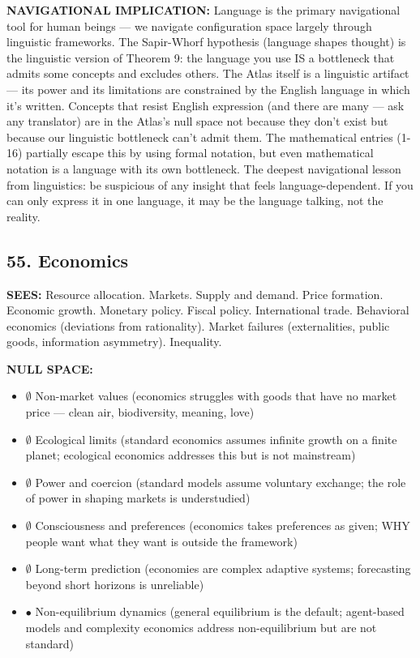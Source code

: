 \textbf{NAVIGATIONAL IMPLICATION:} Language is the primary navigational tool for human beings — we navigate configuration space largely through linguistic frameworks. The Sapir-Whorf hypothesis (language shapes thought) is the linguistic version of Theorem 9: the language you use IS a bottleneck that admits some concepts and excludes others. The Atlas itself is a linguistic artifact — its power and its limitations are constrained by the English language in which it's written. Concepts that resist English expression (and there are many — ask any translator) are in the Atlas's null space not because they don't exist but because our linguistic bottleneck can't admit them. The mathematical entries (1-16) partially escape this by using formal notation, but even mathematical notation is a language with its own bottleneck. The deepest navigational lesson from linguistics: be suspicious of any insight that feels language-dependent. If you can only express it in one language, it may be the language talking, not the reality.


\bigskip\noindent\makebox[\textwidth]{\color{rulegray}\rule{5cm}{0.3pt}}\bigskip


\subsection*{55. Economics}


\textbf{SEES:} Resource allocation. Markets. Supply and demand. Price formation. Economic growth. Monetary policy. Fiscal policy. International trade. Behavioral economics (deviations from rationality). Market failures (externalities, public goods, information asymmetry). Inequality.


\textbf{NULL SPACE:}

\begin{itemize}[nosep,leftmargin=*]
  \item $\emptyset$ Non-market values (economics struggles with goods that have no market price — clean air, biodiversity, meaning, love)
  \item $\emptyset$ Ecological limits (standard economics assumes infinite growth on a finite planet; ecological economics addresses this but is not mainstream)
  \item $\emptyset$ Power and coercion (standard models assume voluntary exchange; the role of power in shaping markets is understudied)
  \item $\emptyset$ Consciousness and preferences (economics takes preferences as given; WHY people want what they want is outside the framework)
  \item $\emptyset$ Long-term prediction (economies are complex adaptive systems; forecasting beyond short horizons is unreliable)
  \item $\bullet$ Non-equilibrium dynamics (general equilibrium is the default; agent-based models and complexity economics address non-equilibrium but are not standard)
\end{itemize}


